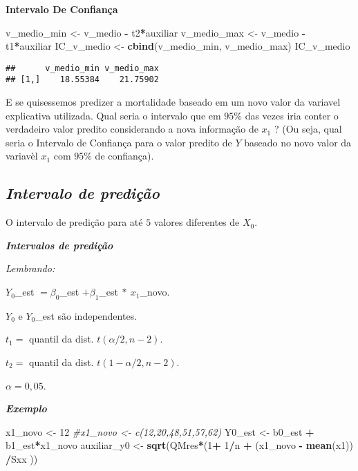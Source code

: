 \documentclass[
]{article}
\newenvironment{Shaded}{\begin{snugshade}}{\end{snugshade}}
\newcommand{\CommentTok}[1]{\textcolor[rgb]{0.56,0.35,0.01}{\textit{#1}}}
\newcommand{\DecValTok}[1]{\textcolor[rgb]{0.00,0.00,0.81}{#1}}
\newcommand{\KeywordTok}[1]{\textcolor[rgb]{0.13,0.29,0.53}{\textbf{#1}}}
\newcommand{\NormalTok}[1]{#1}
\newcommand{\OperatorTok}[1]{\textcolor[rgb]{0.81,0.36,0.00}{\textbf{#1}}}
\newcommand{\StringTok}[1]{\textcolor[rgb]{0.31,0.60,0.02}{#1}}
\begin{document}
\textbf{Intervalo De Confiança}

\begin{Shaded}
\begin{Highlighting}[]
\NormalTok{v_medio_min <-}\StringTok{ }\NormalTok{v_medio }\OperatorTok{-}\StringTok{ }\NormalTok{t2}\OperatorTok{*}\NormalTok{auxiliar}
\NormalTok{v_medio_max <-}\StringTok{ }\NormalTok{v_medio }\OperatorTok{-}\StringTok{ }\NormalTok{t1}\OperatorTok{*}\NormalTok{auxiliar}
\NormalTok{IC_v_medio <-}\StringTok{ }\KeywordTok{cbind}\NormalTok{(v_medio_min, v_medio_max)}
\NormalTok{IC_v_medio}
\end{Highlighting}
\end{Shaded}

\begin{verbatim}
##      v_medio_min v_medio_max
## [1,]    18.55384    21.75902
\end{verbatim}

E se quisessemos predizer a mortalidade baseado em um novo valor da
variavel explicativa utilizada. Qual seria o intervalo que em \(95\%\)
das vezes iria conter o verdadeiro valor predito considerando a nova
informação de \(x_1\) ? (Ou seja, qual seria o Intervalo de Confiança
para o valor predito de \(Y\) baseado no novo valor da variavèl \(x_1\)
com \(95\%\) de confiança).

\hypertarget{intervalo-de-prediuxe7uxe3o}{%
\subsection{\texorpdfstring{\textbf{\emph{Intervalo de
predição}}}{Intervalo de predição}}\label{intervalo-de-prediuxe7uxe3o}}

O intervalo de predição para até \(5\) valores diferentes de \(X_0\).

\textbf{\emph{Intervalos de predição}}

\emph{Lembrando:}

\(Y_0\)\_est \(= \beta_0\)\_est \(+ \beta_1\)\_est\(\ *\ x_1\)\_novo.

\(Y_0\) e \(Y_0\)\_est são independentes.

\(t_1 =\) quantil da dist. \(t(\alpha/2,n-2)\).

\(t_2 =\) quantil da dist. \(t(1-\alpha/2,n-2)\).

\(\alpha = 0,05\).

\textbf{\emph{Exemplo}}

\begin{Shaded}
\begin{Highlighting}[]
\NormalTok{x1_novo <-}\StringTok{ }\DecValTok{12}  
\CommentTok{#x1_novo <- c(12,20,48,51,57,62)}
\NormalTok{Y0_est <-}\StringTok{ }\NormalTok{b0_est }\OperatorTok{+}\StringTok{ }\NormalTok{b1_est}\OperatorTok{*}\NormalTok{x1_novo}
\NormalTok{auxiliar_y0 <-}\StringTok{ }\KeywordTok{sqrt}\NormalTok{(QMres}\OperatorTok{*}\NormalTok{(}\DecValTok{1}\OperatorTok{+}\StringTok{ }\DecValTok{1}\OperatorTok{/}\NormalTok{n }\OperatorTok{+}\StringTok{ }\NormalTok{(x1_novo }\OperatorTok{-}\StringTok{ }\KeywordTok{mean}\NormalTok{(x1)) }\OperatorTok{/}\NormalTok{Sxx ))}
\end{Highlighting}
\end{Shaded}
\end{document}
